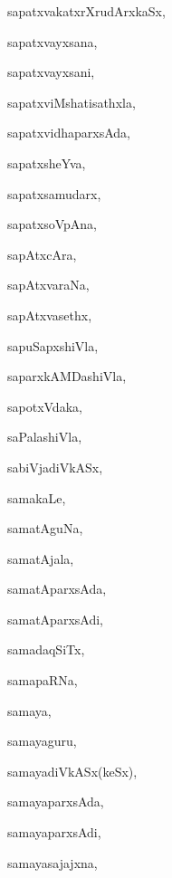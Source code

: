 \begin{multicols}{3}
{\noindent
{sapatxvakatxrXrudArxkaSx}, \pageref{sapatxvakatxrXrudArxkaSx}

\noindent
{sapatxvayxsana}, \pageref{sapatxvayxsana}

\noindent
{sapatxvayxsani}, \pageref{sapatxvayxsani}

\noindent
{sapatxviMshatisathxla}, \pageref{sapatxviMshatisathxla}

\noindent
{sapatxvidhaparxsAda}, \pageref{sapatxvidhaparxsAda}

\noindent
{sapatxsheYva}, \pageref{sapatxsheYva}

\noindent
{sapatxsamudarx}, \pageref{sapatxsamudarx}

\noindent
{sapatxsoVpAna}, \pageref{sapatxsoVpAna}

\noindent
{sapAtxcAra}, \pageref{sapAtxcAra}

\noindent
{sapAtxvaraNa}, \pageref{sapAtxvaraNa}

\noindent
{sapAtxvasethx}, \pageref{sapAtxvasethx}

\noindent
{sapuSapxshiVla}, \pageref{sapuSapxshiVla}

\noindent
{saparxkAMDashiVla}, \pageref{saparxkAMDashiVla}

\noindent
{sapotxVdaka}, \pageref{sapotxVdaka}

\noindent
{saPalashiVla}, \pageref{saPalashiVla}

\noindent
{sabiVjadiVkASx}, \pageref{sabiVjadiVkASx}

\noindent
{samakaLe}, \pageref{samakaLe}

\noindent
{samatAguNa}, \pageref{samatAguNa}

\noindent
{samatAjala}, \pageref{samatAjala}

\noindent
{samatAparxsAda}, \pageref{samatAparxsAda}

\noindent
{samatAparxsAdi}, \pageref{samatAparxsAdi}

\noindent
{samadaqSiTx}, \pageref{samadaqSiTx}

\noindent
{samapaRNa}, \pageref{samapaRNa}

\noindent
{samaya}, \pageref{samaya}

\noindent
{samayaguru}, \pageref{samayaguru}

\noindent
{samayadiVkASx(keSx)}, \pageref{samayadiVkASxkeSx}

\noindent
{samayaparxsAda}, \pageref{samayaparxsAda}

\noindent
{samayaparxsAdi}, \pageref{samayaparxsAdi}

\noindent
{samayasajajxna}, \pageref{samayasajajxna}

}
\end{multicols}
